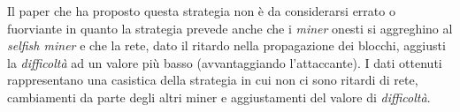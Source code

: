Il paper che ha proposto questa strategia non è da considerarsi errato o fuorviante in quanto la strategia prevede anche che i \textit{miner} onesti si aggreghino al \textit{selfish miner} e che la rete, dato il ritardo nella propagazione dei blocchi, aggiusti la \textit{difficoltà} ad un valore più basso (avvantaggiando l'attaccante). I dati ottenuti rappresentano una casistica della strategia in cui non ci sono ritardi di rete, cambiamenti da parte degli altri miner e aggiustamenti del valore di \textit{difficoltà}.\newline


